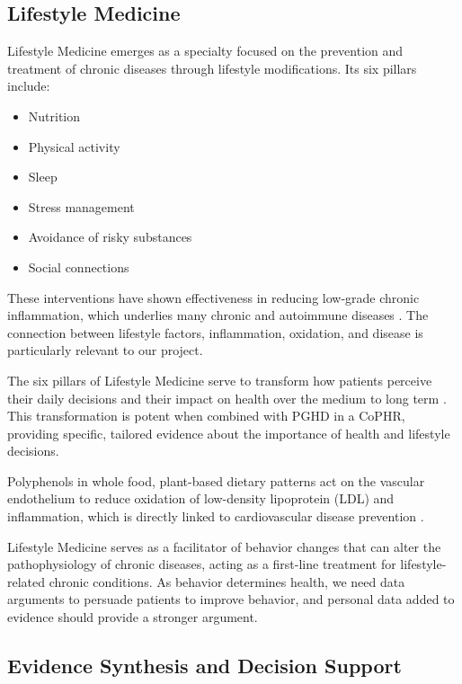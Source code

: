 \subsection{Lifestyle Medicine}

Lifestyle Medicine emerges as a specialty focused on the prevention and treatment of chronic diseases through lifestyle modifications. Its six pillars include:

\begin{itemize}
\item Nutrition
\item Physical activity
\item Sleep
\item Stress management
\item Avoidance of risky substances
\item Social connections
\end{itemize}

These interventions have shown effectiveness in reducing low-grade chronic inflammation, which underlies many chronic and autoimmune diseases \cite{LM2023}. The connection between lifestyle factors, inflammation, oxidation, and disease is particularly relevant to our project.

The six pillars of Lifestyle Medicine serve to transform how patients perceive their daily decisions and their impact on health over the medium to long term \cite{clayton2023foundations}. This transformation is potent when combined with PGHD in a CoPHR, providing specific, tailored evidence about the importance of health and lifestyle decisions.

Polyphenols in whole food, plant-based dietary patterns act on the vascular endothelium to reduce oxidation of low-density lipoprotein (LDL) and inflammation, which is directly linked to cardiovascular disease prevention \cite{IBLM2023}.

Lifestyle Medicine serves as a facilitator of behavior changes that can alter the pathophysiology of chronic diseases, acting as a first-line treatment for lifestyle-related chronic conditions. As behavior determines health, we need data arguments to persuade patients to improve behavior, and personal data added to evidence should provide a stronger argument.

\subsection{Evidence Synthesis and Decision Support}

